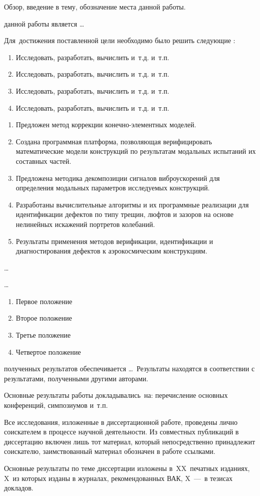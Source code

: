
{\actuality} Обзор, введение в тему, обозначение места данной работы.

{\aim} данной работы является \ldots

Для~достижения поставленной цели необходимо было решить следующие {\tasks}:
\begin{enumerate}[beginpenalty = 10000] 
	\item Исследовать, разработать, вычислить и~т.\:д. и~т.\:п.
	\item Исследовать, разработать, вычислить и~т.\:д. и~т.\:п.
	\item Исследовать, разработать, вычислить и~т.\:д. и~т.\:п.
	\item Исследовать, разработать, вычислить и~т.\:д. и~т.\:п.
\end{enumerate}

{\novelty}
\begin{enumerate}[beginpenalty = 10000] 
	\item Предложен метод коррекции конечно-элементных моделей. 
	\item Создана программная платформа, позволяющая верифицировать математические модели конструкций по результатам модальных испытаний их составных частей.
	\item Предложена методика декомпозиции сигналов виброускорений для определения модальных параметров исследуемых конструкций.
	\item Разработаны вычислительные алгоритмы и их программные реализации для идентификации дефектов по типу трещин, люфтов и зазоров на основе нелинейных искажений портретов колебаний.
	\item Результаты применения методов верификации, идентификации и диагностирования дефектов к аэрокосмическим конструкциям.
\end{enumerate}

{\influence} \ldots

{\methods} \ldots

{}
\begin{enumerate}[beginpenalty = 10000] 
	\item Первое положение
	\item Второе положение
	\item Третье положение
	\item Четвертое положение
\end{enumerate}

{\reliability} полученных результатов обеспечивается \ldots \ Результаты находятся в соответствии с результатами, полученными другими авторами.

{\probation}
Основные результаты работы докладывались~на: перечисление основных конференций, симпозиумов и~т.\:п.

{\contribution} 
Все исследования, изложенные в диссертационной работе, проведены лично соискателем в процессе научной
деятельности. Из совместных публикаций в диссертацию включен лишь тот материал, который непосредственно принадлежит соискателю, заимствованный материал обозначен в работе ссылками.

{\publications} 
Основные результаты по теме диссертации изложены в~XX~печатных изданиях, X~из которых изданы в журналах, рекомендованных ВАК, X~---~в тезисах докладов.

